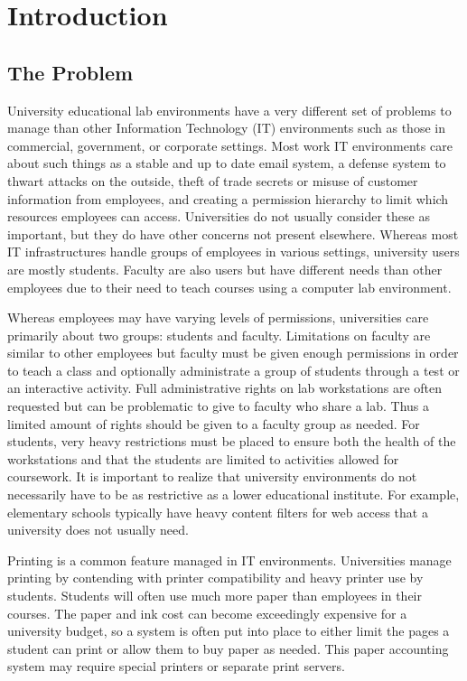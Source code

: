 \chapter{Introduction} \label{ch:introduction}
\section{The Problem} \label{sec:the_problem}
University educational lab environments have a very different set of problems to manage than other Information Technology (IT) environments such as those in commercial, government, or corporate settings.  Most work IT environments care about such things as a stable and up to date email system, a defense system to thwart attacks on the outside, theft of trade secrets or misuse of customer information from employees, and creating a permission hierarchy to limit which resources employees can access.  Universities do not usually consider these as important, but they do have other concerns not present elsewhere.  Whereas most IT infrastructures handle groups of employees in various settings, university users are mostly students.  Faculty are also users but have different needs than other employees due to their need to teach courses using a computer lab environment.  

Whereas employees may have varying levels of permissions, universities care primarily about two groups:  students and faculty.  Limitations on faculty are similar to other employees but faculty must be given enough permissions in order to teach a class and optionally administrate a group of students through a test or an interactive activity.  Full administrative rights on lab workstations are often requested but can be problematic to give to faculty who share a lab.  Thus a limited amount of rights should be given to a faculty group as needed.  For students, very heavy restrictions must be placed to ensure both the health of the workstations and that the students are limited to activities allowed for coursework.  It is important to realize that university environments do not necessarily have to be as restrictive as a lower educational institute.  For example, elementary schools typically have heavy content filters for web access that a university does not usually need.

Printing is a common feature managed in IT environments.  Universities manage printing by contending with printer compatibility and heavy printer use by students.  Students will often use much more paper than employees in their courses.  The paper and ink cost can become exceedingly expensive for a university budget, so a system is often put into place to either limit the pages a student can print or allow them to buy paper as needed.  This paper accounting system may require special printers or separate print servers.  

